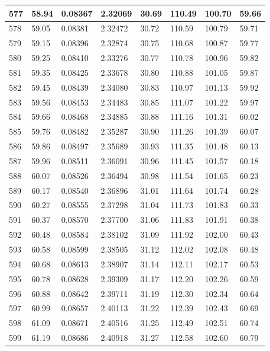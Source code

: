 \documentclass[12pt,a4paper,twoside]{article}
\begin{document}
\begin{center}
\begin{longtable}{l l l l | l l l l}
577 & 58.94 & 0.08367 & 2.32069 & 30.69 & 110.49 & 100.70 & 59.66 \\ \hline
578 & 59.05 & 0.08381 & 2.32472 & 30.72 & 110.59 & 100.79 & 59.71 \\ \hline
579 & 59.15 & 0.08396 & 2.32874 & 30.75 & 110.68 & 100.87 & 59.77 \\ \hline
580 & 59.25 & 0.08410 & 2.33276 & 30.77 & 110.78 & 100.96 & 59.82 \\ \hline
581 & 59.35 & 0.08425 & 2.33678 & 30.80 & 110.88 & 101.05 & 59.87 \\ \hline
582 & 59.45 & 0.08439 & 2.34080 & 30.83 & 110.97 & 101.13 & 59.92 \\ \hline
583 & 59.56 & 0.08453 & 2.34483 & 30.85 & 111.07 & 101.22 & 59.97 \\ \hline
584 & 59.66 & 0.08468 & 2.34885 & 30.88 & 111.16 & 101.31 & 60.02 \\ \hline
585 & 59.76 & 0.08482 & 2.35287 & 30.90 & 111.26 & 101.39 & 60.07 \\ \hline
586 & 59.86 & 0.08497 & 2.35689 & 30.93 & 111.35 & 101.48 & 60.13 \\ \hline
587 & 59.96 & 0.08511 & 2.36091 & 30.96 & 111.45 & 101.57 & 60.18 \\ \hline
588 & 60.07 & 0.08526 & 2.36494 & 30.98 & 111.54 & 101.65 & 60.23 \\ \hline
589 & 60.17 & 0.08540 & 2.36896 & 31.01 & 111.64 & 101.74 & 60.28 \\ \hline
590 & 60.27 & 0.08555 & 2.37298 & 31.04 & 111.73 & 101.83 & 60.33 \\ \hline
591 & 60.37 & 0.08570 & 2.37700 & 31.06 & 111.83 & 101.91 & 60.38 \\ \hline
592 & 60.48 & 0.08584 & 2.38102 & 31.09 & 111.92 & 102.00 & 60.43 \\ \hline
593 & 60.58 & 0.08599 & 2.38505 & 31.12 & 112.02 & 102.08 & 60.48 \\ \hline
594 & 60.68 & 0.08613 & 2.38907 & 31.14 & 112.11 & 102.17 & 60.53 \\ \hline
595 & 60.78 & 0.08628 & 2.39309 & 31.17 & 112.20 & 102.26 & 60.59 \\ \hline
596 & 60.88 & 0.08642 & 2.39711 & 31.19 & 112.30 & 102.34 & 60.64 \\ \hline
597 & 60.99 & 0.08657 & 2.40113 & 31.22 & 112.39 & 102.43 & 60.69 \\ \hline
598 & 61.09 & 0.08671 & 2.40516 & 31.25 & 112.49 & 102.51 & 60.74 \\ \hline
599 & 61.19 & 0.08686 & 2.40918 & 31.27 & 112.58 & 102.60 & 60.79 \\ \hline

\end{longtable}
\end{center}
\end{document}
